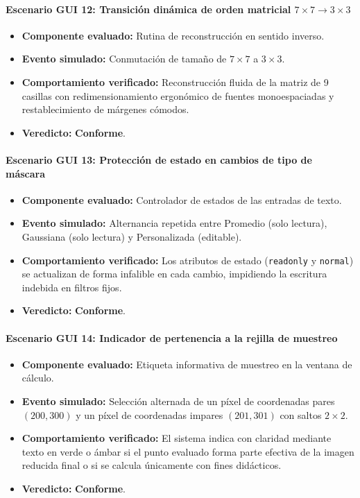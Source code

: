 \documentclass[11pt]{article}
\newcommand{\pruebaok}{\textcolor{verdeExito}{\textbf{Conforme}}}
\begin{document}
\paragraph{Escenario GUI 12: Transición dinámica de orden matricial $7\times7 \to 3\times3$}
\begin{itemize}[itemsep=0.15em]
\item \textbf{Componente evaluado:} Rutina de reconstrucción en sentido inverso.
\item \textbf{Evento simulado:} Conmutación de tamaño de $7\times7$ a $3\times3$.
\item \textbf{Comportamiento verificado:} Reconstrucción fluida de la matriz de 9 casillas con redimensionamiento ergonómico de fuentes monoespaciadas y restablecimiento de márgenes cómodos.
\item \textbf{Veredicto:} \pruebaok.
\end{itemize}

\paragraph{Escenario GUI 13: Protección de estado en cambios de tipo de máscara}
\begin{itemize}[itemsep=0.15em]
\item \textbf{Componente evaluado:} Controlador de estados de las entradas de texto.
\item \textbf{Evento simulado:} Alternancia repetida entre Promedio (solo lectura), Gaussiana (solo lectura) y Personalizada (editable).
\item \textbf{Comportamiento verificado:} Los atributos de estado (\texttt{readonly} y \texttt{normal}) se actualizan de forma infalible en cada cambio, impidiendo la escritura indebida en filtros fijos.
\item \textbf{Veredicto:} \pruebaok.
\end{itemize}

\paragraph{Escenario GUI 14: Indicador de pertenencia a la rejilla de muestreo}
\begin{itemize}[itemsep=0.15em]
\item \textbf{Componente evaluado:} Etiqueta informativa de muestreo en la ventana de cálculo.
\item \textbf{Evento simulado:} Selección alternada de un píxel de coordenadas pares $(200, 300)$ y un píxel de coordenadas impares $(201, 301)$ con saltos $2\times2$.
\item \textbf{Comportamiento verificado:} El sistema indica con claridad mediante texto en verde o ámbar si el punto evaluado forma parte efectiva de la imagen reducida final o si se calcula únicamente con fines didácticos.
\item \textbf{Veredicto:} \pruebaok.
\end{itemize}
\end{document}
